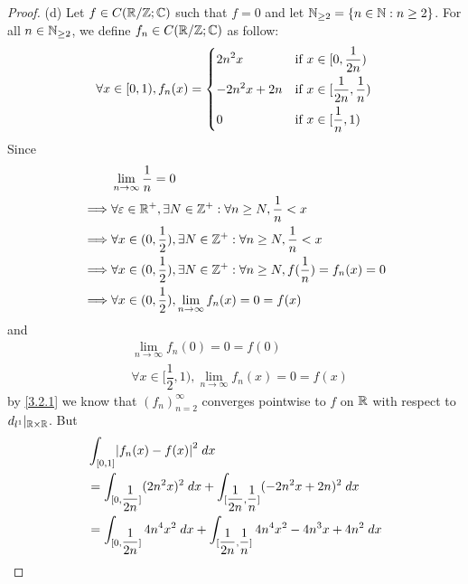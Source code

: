 \begin{proof}{(d)}
  Let \(f \in C(\mathbb{R} / \mathbb{Z} ; \mathbb{C})\) such that \(f = 0\) and let \(\mathbb{N}_{\geq 2} = \left\lbrace n \in \mathbb{N} : n \geq 2\right\rbrace\).
  For all \(n \in \mathbb{N}_{\geq 2}\), we define \(f_n \in C(\mathbb{R} / \mathbb{Z} ; \mathbb{C})\) as follow:
  \[
    \forall x \in [0, 1), f_n(x) = \begin{dcases}
      2 n^2 x       & \text{if } x \in [0, \dfrac{1}{2n})            \\
      -2 n^2 x + 2n & \text{if } x \in [\dfrac{1}{2n}, \dfrac{1}{n}) \\
      0             & \text{if } x \in [\dfrac{1}{n}, 1)
    \end{dcases}
  \]
  Since
  \begin{align*}
             & \lim_{n \to \infty} \dfrac{1}{n} = 0                                                                 \\
    \implies & \forall \varepsilon \in \mathbb{R}^+, \exists N \in \mathbb{Z}^+ : \forall n \geq N, \dfrac{1}{n} < x                \\
    \implies & \forall x \in (0, \dfrac{1}{2}), \exists N \in \mathbb{Z}^+ : \forall n \geq N, \dfrac{1}{n} < x             \\
    \implies & \forall x \in (0, \dfrac{1}{2}), \exists N \in \mathbb{Z}^+ : \forall n \geq N, f(\dfrac{1}{n}) = f_n(x) = 0 \\
    \implies & \forall x \in (0, \dfrac{1}{2}), \lim_{n \to \infty} f_n(x) = 0 = f(x)
  \end{align*}
  and
  \begin{align*}
     & \lim_{n \to \infty} f_n(0) = 0 = f(0)                                  \\
     & \forall x \in [\dfrac{1}{2}, 1), \lim_{n \to \infty} f_n(x) = 0 = f(x)
  \end{align*}
  by \cref{3.2.1} we know that \((f_n)_{n = 2}^\infty\) converges pointwise to \(f\) on \(\mathbb{R}\) with respect to \(d_{l^1}|_{\mathbb{R} \times \mathbb{R}}\).
  But
  \begin{align*}
     & \int_{[0, 1]} \abs{f_n(x) - f(x)}^2 \; dx                                                                                                                    \\
     & = \int_{[0, \dfrac{1}{2n}]} (2 n^2 x)^2 \; dx + \int_{[\dfrac{1}{2n}, \dfrac{1}{n}]} (-2n^2 x + 2n)^2 \; dx                                                  \\
     & = \int_{[0, \dfrac{1}{2n}]} 4 n^4 x^2 \; dx + \int_{[\dfrac{1}{2n}, \dfrac{1}{n}]} 4 n^4 x^2 - 4 n^3 x + 4n^2 \; dx                                          \\

\end{align*}
\end{proof}
